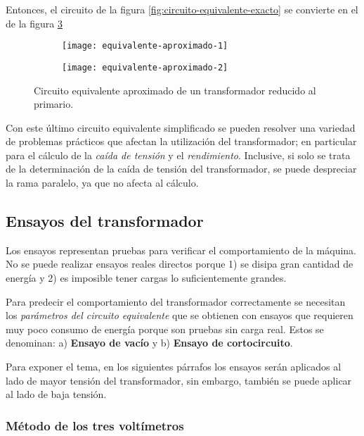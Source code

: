 Entonces, el circuito de la figura \ref{fig:circuito-equivalente-exacto} se convierte en el de la figura \ref{fig:aproximado-2}

\begin{figure}[H]
	\centering
	\begin{subfigure}[b]{0.4\textwidth}
		\centering
		\texttt{[image: equivalente-aproximado-1]}
		\subcaption{}
		\label{fig:aproximado-1}
	\end{subfigure}
	\begin{subfigure}[b]{0.4\textwidth}
		\centering
		\texttt{[image: equivalente-aproximado-2]}
		\subcaption{}
		\label{fig:aproximado-2}
	\end{subfigure}
	\caption{Circuito equivalente aproximado de un transformador reducido al primario.}
\end{figure}

Con este último circuito equivalente simplificado se pueden resolver una variedad de problemas prácticos que afectan la utilización del transformador; en particular para el cálculo de la \textsl{caída de tensión} y el \textsl{rendimiento}. Inclusive, si solo se trata de la determinación de la caída de tensión del transformador, se puede despreciar la rama paralelo, ya que no afecta al cálculo.

\subsection{Ensayos del transformador}
Los ensayos representan pruebas para verificar el comportamiento de la máquina. No se puede realizar ensayos reales directos porque 1) se disipa gran cantidad de energía y 2) es imposible tener cargas lo suficientemente grandes.


Para predecir el comportamiento del transformador correctamente se necesitan los \textsl{parámetros del circuito equivalente} que se obtienen con ensayos que requieren muy poco consumo de energía porque son pruebas sin carga real. Estos se denominan: a) \textbf{Ensayo de vacío} y b) \textbf{Ensayo de cortocircuito}.

Para exponer el tema, en los siguientes párrafos los ensayos serán aplicados al lado de mayor tensión del transformador, sin embargo, también se puede aplicar al lado de baja tensión.

\subsubsection{Método de los tres voltímetros}

